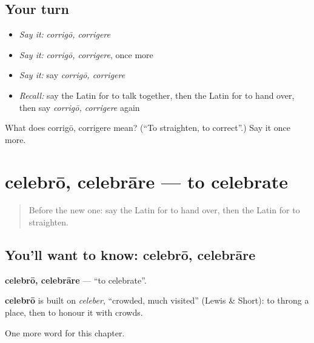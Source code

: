 \subsection*{Your turn}
\begin{itemize}
\raggedright
  \item \emph{Say it:} \emph{corrigō, corrigere}
  \item \emph{Say it:} \emph{corrigō, corrigere}, once more
  \item \emph{Say it:} say \emph{corrigō, corrigere}
  \item \emph{Recall:} say the Latin for to talk together, then the Latin for to hand over, then say \emph{corrigō, corrigere} again
\end{itemize}

\begin{tcolorbox}[breakable,colback=teal!4,colframe=teal!35!black,title={Before you move on}]
What does corrigō, corrigere mean? (\textquotedblleft{}To straighten, to correct\textquotedblright{}.) Say it once more.
\end{tcolorbox}
\section[celebrō, celebrāre]{celebrō, celebrāre — to celebrate}

\label{lesson:LA-C201-celebro}



\begin{quote}
Before the new one: say the Latin for to hand over, then the Latin for to straighten.
\end{quote}

\subsection*{You'll want to know: celebrō, celebrāre}
\textbf{celebrō, celebrāre} — \textquotedblleft{}to celebrate\textquotedblright{}.

\begin{cousinweb}
\textbf{celebrō} is built on \emph{celeber}, \textquotedblleft{}crowded, much visited\textquotedblright{} (Lewis \& Short): to throng a place, then to honour it with crowds.
\end{cousinweb}

\begin{grammarlens}[title={What you've built}]
One more word for this chapter.
\end{grammarlens}


